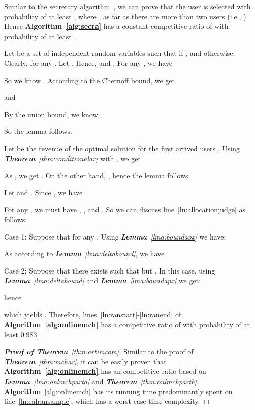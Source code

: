 \documentclass[10pt,journal,compsoc]{IEEEtran}
\begin{document}
\begin{IEEEproof} 
Similar to the secretary algorithm~\cite{Dynkin1963}, we can prove that the user  is selected with probability of at least , where , as far as there are more than two users (i.e., ). Hence \textbf{Algorithm~\ref{alg:secra}} has a constant competitive ratio of  with probability of at least .
\end{IEEEproof}


\begin{IEEEproof} 
Let  be a set of independent random variables such that   if , and  otherwise. Clearly,  for any . Let . Hence,  and . For any , we have

So we know . According to the Chernoff bound, we get

and

By the union bound, we know

So the lemma follows.
\end{IEEEproof}

\begin{IEEEproof} 
Let  be the revenue of the optimal solution for the first arrived  users . Using \textit{\textbf{Theorem}~\ref{thm:conditionalar}} with , we get

As , we get . On the other hand, , hence the lemma follows.
\end{IEEEproof}

\begin{IEEEproof} 
Let  and . Since , we have

For any , we must have , , and . So we can discuss line~\ref{ln:allocationjudge} as follows:

  Case 1: Suppose that   for any . Using \textit{\textbf{Lemma}~\ref{lma:boundapx}} we have:

As  according to \textit{\textbf{Lemma}~\ref{lma:deltabound}}, we have


  Case 2: Suppose that there exists  such that  but . In this case, using \textit{\textbf{Lemma}~\ref{lma:deltabound}} and \textit{\textbf{Lemma}~\ref{lma:boundapx}} we get:

hence

which yields . Therefore, lines~\ref{ln:ranstart}-\ref{ln:ranend} of \textbf{Algorithm~\ref{alg:onlinemch}} has a competitive ratio of  with probability of at least 0.983.
\end{IEEEproof}

\begin{proof} [\textbf{Proof of Theorem}~\ref{thm:artimcom}]
Similar to the proof of \textit{\textbf{Theorem}~\ref{thm:mchar}}, it can be easily proven that \textbf{Algorithm~\ref{alg:onlinemch}} has an  competitive ratio based on \textit{\textbf{Lemma}~\ref{lma:onlmchparta}} and \textit{\textbf{Theorem}~\ref{thm:onlmchpartb}}. \textbf{Algorithm}~\ref{alg:onlinemch} has its running time predominantly spent on line~\ref{ln:calransample}, which has a  worst-case time complexity.
\end{proof}
\end{document}
